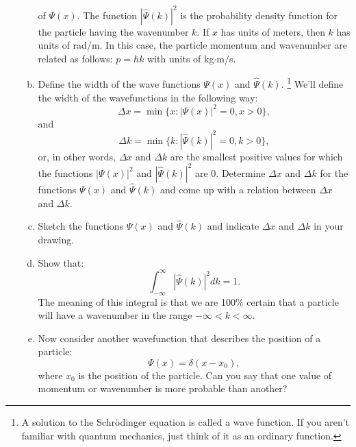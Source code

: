 \begin{enumerate}
\begin{enumerate}[a)]
{} of $\Psi(x)$. The function $|\hat{\Psi}(k)|^{2}$ is the probability
density function for the particle having the wavenumber $k$. If $x$
has units of meters, then $k$ has units of rad/m. In this case, the
particle momentum and wavenumber are related as follows:
$p = \hbar k$ with units of kg$\cdot$m$/$s.

\item Define the width of the wave functions $\Psi(x)$ and $\hat{\Psi}(k)$.
\footnote{A solution to the Schrödinger equation is called a wave function. If you aren't familiar with quantum mechanics, just think of it as an ordinary function.} 
We'll define the width of the wavefunctions in the following way:
$$\Delta x = \min\{x : |\Psi(x)|^{2}=0,x>0\},$$
and 
$$\Delta k = \min\{k : |\hat{\Psi}(k)|^{2}=0,k>0\},$$
or, in other words, $\Delta x$ and $\Delta k$ are the smallest positive values for which the functions $|\Psi(x)|^{2}$ and $|\hat{\Psi}(k)|^{2}$ are $0$. 
Determine $\Delta x$ and $\Delta k$ for the functions $\Psi(x)$ and $\hat{\Psi}(k)$ and come up with a relation between $\Delta x$ and $\Delta k$.

\item Sketch the functions $\Psi(x)$ and $\hat{\Psi}(k)$ and indicate $\Delta x$ and $\Delta k$ in your drawing. 

\item Show that:
$$\int_{-\infty}^{\infty} |\hat{\Psi}(k)|^{2}dk=1.$$ The meaning of this
integral is that we are 100\% certain that a particle will have a wavenumber in the range $-\infty<k<\infty$.

\item Now consider another wavefunction that describes the position of a particle:
\begin{equation}
\Psi(x) = \delta(x-x_0),
\end{equation}
where $x_0$ is the position of the particle. Can you say that one
value of momentum or wavenumber is more probable than another?

\end{enumerate}



\end{enumerate}
